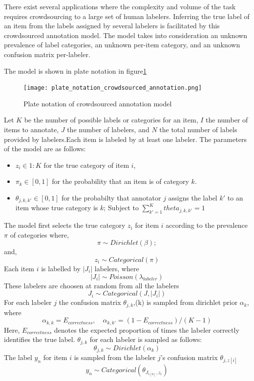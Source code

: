 \documentclass[../main.tex]{subfiles}
\begin{document}
There exist several applications where the complexity and volume of the task requires crowdsourcing to a large set of human labelers.
Inferring the true label of an item from the labels assigned by several labelers is facilitated by this crowdsourced annotation model\cite{passonneau2014benefits}.
The model takes into consideration an unknown prevalence of label categories, an unknown per-item category, and an unknown confusion matrix per-labeler.

The model is shown in plate notation in figure\ref{fig:fig4} \newline
\begin{figure}[h]
  \centering
  \texttt{[image: plate\_notation\_crowdsourced\_annotation.png]}
  \caption{Plate notation of crowdsourced annotation model\cite{passonneau2014benefits}}
  \label{fig:fig4}
\end{figure}

Let $K$ be the number of possible labels or categories for an item, $I$ the number of items to annotate, $J$ the number of labelers, and $N$ the total number of labels provided by labelers.Each item is labeled by at least one labeler.\newline
The parameters of the model are as follows:
\begin{itemize}
\item $z_i \in 1:K$ for the true category of item $i$,
\item $\pi_k \in [0, 1]$ for the probability that an item is of
category $k$.
\item $\theta_{j,k,k'} \in [0, 1]$ for the probabilty that annotator $j$ assigns the label $k'$ to an item whose true category is $k$;
Subject to $\sum_{k'=1}^{K}theta_{j,k,k'} = 1$
\end{itemize}
The model first selects the true category $z_i$ for item $i$ according to the prevalence $\pi$ of categories where,
$$
\pi \sim Dirichlet(\beta);
$$
and,
$$
z_i \sim Categorical(\pi)
$$
Each item $i$ is labelled by $|J_i|$ labelers, where
$$
|J_i| \sim Poisson(\lambda_{labeler})
$$
These labelers are choosen at random from all the labelers
$$
J_i \sim Categorical(J, |J_i|)
$$
For each labeler $j$ the confusion matrix $\theta_{j,k}$,(k) is sampled from dirichlet prior $\alpha_k$, where
$$
\alpha_{k,k} = E_{correctness}, \quad \alpha_{k,k'} = (1- E_{correctness})/(K-1)
$$
Here, $E_{correctness}$ denotes the expected proportion of times the labeler correctly identifies the true label.
$\theta_{j,k}$ for each labeler is sampled as follows:
$$
\theta_{j,k} \sim Dirichlet(\alpha_k)
$$
The label $y_n$ for item $i$ is sampled from the labeler $j$'s confusion matrix $\theta_{j,z[i]}$
$$
y_n \sim Categorical(\theta_{J_{i[n]}, z_i})
$$
\end{document}
